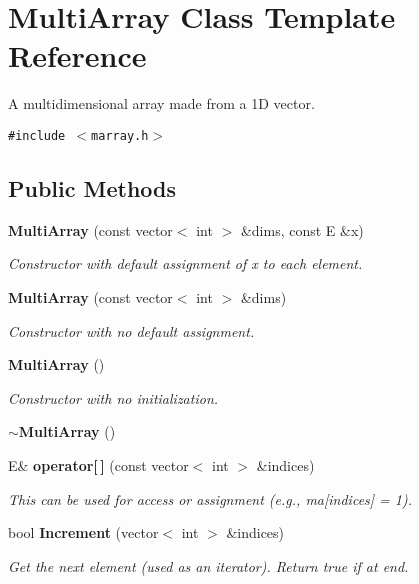\section{Multi\-Array  Class Template Reference}
\label{classMultiArray}
A multidimensional array made from a 1D vector. 


{\tt \#include $<$marray.h$>$}

\subsection*{Public Methods}
\begin{CompactItemize}
\item 
{\bf Multi\-Array} (const vector$<$ int $>$ \&dims, const E \&x)
\begin{CompactList}\small\item\em Constructor with default assignment of x to each element.\item\end{CompactList}\item 
{\bf Multi\-Array} (const vector$<$ int $>$ \&dims)
\begin{CompactList}\small\item\em Constructor with no default assignment.\item\end{CompactList}\item 
{\bf Multi\-Array} ()
\begin{CompactList}\small\item\em Constructor with no initialization.\item\end{CompactList}\item 
{\bf $\sim$Multi\-Array} ()
\item 
E\& {\bf operator[$\,$]} (const vector$<$ int $>$ \&indices)
\begin{CompactList}\small\item\em This can be used for access or assignment (e.g., ma[indices] = 1).\item\end{CompactList}\item 
bool {\bf Increment} (vector$<$ int $>$ \&indices)
\begin{CompactList}\small\item\em Get the next element (used as an iterator). Return true if at end.\item\end{CompactList}\end{CompactItemize}

